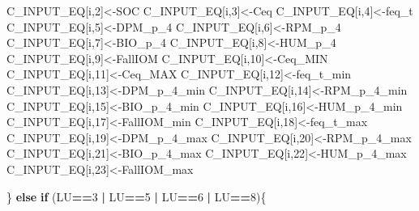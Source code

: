 \documentclass[
  10pt,
  b5paper,
]{book}
\newenvironment{Shaded}{\begin{snugshade}}{\end{snugshade}}
\newcommand{\ControlFlowTok}[1]{\textcolor[rgb]{0.13,0.29,0.53}{\textbf{#1}}}
\newcommand{\DecValTok}[1]{\textcolor[rgb]{0.00,0.00,0.81}{#1}}
\newcommand{\NormalTok}[1]{#1}
\newcommand{\OperatorTok}[1]{\textcolor[rgb]{0.81,0.36,0.00}{\textbf{#1}}}
\newcommand{\StringTok}[1]{\textcolor[rgb]{0.31,0.60,0.02}{#1}}
\begin{document}
\begin{Shaded}
\begin{Highlighting}[]
{\NormalTok{C_INPUT_EQ[i,}\DecValTok{2}\NormalTok{]<-SOC}
\NormalTok{C_INPUT_EQ[i,}\DecValTok{3}\NormalTok{]<-Ceq}
\NormalTok{C_INPUT_EQ[i,}\DecValTok{4}\NormalTok{]<-feq_t}
\NormalTok{C_INPUT_EQ[i,}\DecValTok{5}\NormalTok{]<-DPM_p_}\DecValTok{4}
\NormalTok{C_INPUT_EQ[i,}\DecValTok{6}\NormalTok{]<-RPM_p_}\DecValTok{4}
\NormalTok{C_INPUT_EQ[i,}\DecValTok{7}\NormalTok{]<-BIO_p_}\DecValTok{4}
\NormalTok{C_INPUT_EQ[i,}\DecValTok{8}\NormalTok{]<-HUM_p_}\DecValTok{4}
\NormalTok{C_INPUT_EQ[i,}\DecValTok{9}\NormalTok{]<-FallIOM}
\NormalTok{C_INPUT_EQ[i,}\DecValTok{10}\NormalTok{]<-Ceq_MIN}
\NormalTok{C_INPUT_EQ[i,}\DecValTok{11}\NormalTok{]<-Ceq_MAX}
\NormalTok{C_INPUT_EQ[i,}\DecValTok{12}\NormalTok{]<-feq_t_min}
\NormalTok{C_INPUT_EQ[i,}\DecValTok{13}\NormalTok{]<-DPM_p_}\DecValTok{4}\NormalTok{_min}
\NormalTok{C_INPUT_EQ[i,}\DecValTok{14}\NormalTok{]<-RPM_p_}\DecValTok{4}\NormalTok{_min}
\NormalTok{C_INPUT_EQ[i,}\DecValTok{15}\NormalTok{]<-BIO_p_}\DecValTok{4}\NormalTok{_min}
\NormalTok{C_INPUT_EQ[i,}\DecValTok{16}\NormalTok{]<-HUM_p_}\DecValTok{4}\NormalTok{_min}
\NormalTok{C_INPUT_EQ[i,}\DecValTok{17}\NormalTok{]<-FallIOM_min}
\NormalTok{C_INPUT_EQ[i,}\DecValTok{18}\NormalTok{]<-feq_t_max}
\NormalTok{C_INPUT_EQ[i,}\DecValTok{19}\NormalTok{]<-DPM_p_}\DecValTok{4}\NormalTok{_max}
\NormalTok{C_INPUT_EQ[i,}\DecValTok{20}\NormalTok{]<-RPM_p_}\DecValTok{4}\NormalTok{_max}
\NormalTok{C_INPUT_EQ[i,}\DecValTok{21}\NormalTok{]<-BIO_p_}\DecValTok{4}\NormalTok{_max}
\NormalTok{C_INPUT_EQ[i,}\DecValTok{22}\NormalTok{]<-HUM_p_}\DecValTok{4}\NormalTok{_max}
\NormalTok{C_INPUT_EQ[i,}\DecValTok{23}\NormalTok{]<-FallIOM_max}

\NormalTok{\} }\ControlFlowTok{else} \ControlFlowTok{if}\NormalTok{ (LU}\OperatorTok{==}\DecValTok{3} \OperatorTok{|}\StringTok{ }\NormalTok{LU}\OperatorTok{==}\DecValTok{5} \OperatorTok{|}\StringTok{ }\NormalTok{LU}\OperatorTok{==}\DecValTok{6} \OperatorTok{|}\StringTok{ }\NormalTok{LU}\OperatorTok{==}\DecValTok{8}\NormalTok{)\{}

}
\end{Highlighting}
\end{Shaded}
\end{document}

